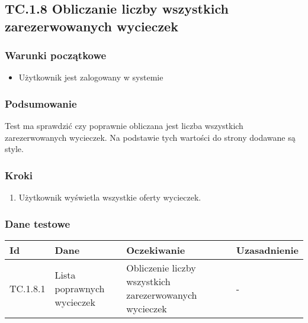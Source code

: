 \documentclass[a4paper,15pt]{article}
\begin{document}
\newpage
\begin{framed}
\subsection{TC.1.8 Obliczanie liczby wszystkich zarezerwowanych wycieczek}


\vspace{0.5cm}

\subsubsection{Warunki początkowe}
\begin{itemize}
\item Użytkownik jest zalogowany w systemie
\end{itemize}

\subsubsection{Podsumowanie}
Test ma sprawdzić czy poprawnie obliczana jest liczba wszystkich zarezerwowanych wycieczek. Na podstawie tych wartości do strony dodawane są style. 

\subsubsection{Kroki}
\begin{enumerate}
\item Użytkownik wyświetla wszystkie oferty wycieczek.
\end{enumerate}

\subsubsection{Dane testowe}

\begin{center}
\begin{tabular}{ |C{1.5cm}|C{3cm}|C{4cm}|C{4cm}| } 
 \hline
 \textbf{Id} & \textbf{Dane} & \textbf{Oczekiwanie} & \textbf{Uzasadnienie} \\ \hline
 TC.1.8.1 & Lista poprawnych wycieczek & Obliczenie liczby wszystkich zarezerwowanych wycieczek & - \\ \hline
\end{tabular}
\end{center}

\end{framed}
\end{document}
